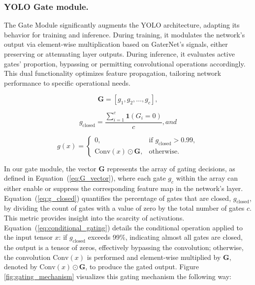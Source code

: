 \documentclass[runningheads]{llncs}
\begin{document}
\subsubsection{YOLO Gate module.} The Gate Module significantly augments the YOLO architecture, adapting its behavior for training and inference. During training, it modulates the network’s output via element-wise multiplication based on GaterNet's signals, either preserving or attenuating layer outputs. During inference, it evaluates active gates' proportion, bypassing or permitting convolutional operations accordingly. This dual functionality optimizes feature propagation, tailoring network performance to specific operational needs.

\begin{equation}
\mathbf{G} = [g_1, g_2, \ldots, g_c], \label{eq:G_vector}
\end{equation}

\begin{equation}
g_{\text{closed}} = \frac{\sum_{i=1}^{c} \mathbf{1}(G_i = 0)}{c}, and \label{eq:g_closed}
\end{equation}

\begin{equation}
g(x) = 
\begin{cases} 
0, & \text{if } g_{\text{closed}} > 0.99, \\
\text{Conv}(x) \odot \mathbf{G}, & \text{otherwise}.
\end{cases} \label{eq:conditional_gating}
\end{equation}

In our gate module, the vector \(\mathbf{G}\) represents the array of gating decisions, as defined in Equation~(\ref{eq:G_vector}), where each gate \(g_c\) within the array can either enable or suppress the corresponding feature map in the network’s layer. Equation~(\ref{eq:g_closed}) quantifies the percentage of gates that are closed, \(g_{\text{closed}}\), by dividing the count of gates with a value of zero by the total number of gates \(c\). This metric provides insight into the scarcity of activations. Equation~(\ref{eq:conditional_gating}) details the conditional operation applied to the input tensor \(x\): if \(g_{\text{closed}}\) exceeds 99\%, indicating almost all gates are closed, the output is a tensor of zeros, effectively bypassing the convolution; otherwise, the convolution \(\text{Conv}(x)\) is performed and element-wise multiplied by \(\mathbf{G}\), denoted by \(\text{Conv}(x) \odot \mathbf{G}\), to produce the gated output. Figure \ref{fig:gating_mechanism} visualizes this gating mechanism the following way:
\end{document}
